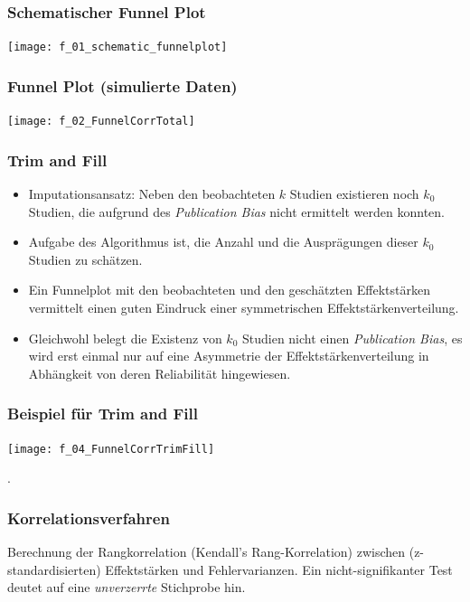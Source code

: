\begin{frame}[plain]
  \frametitle{Schematischer Funnel Plot}
  \begin{center}
    \texttt{[image: f\_01\_schematic\_funnelplot]}
  \end{center}
  \citep[Quelle: ][666]{weis_identification_2011}
\end{frame}



\begin{frame}[plain]
  \frametitle{Funnel Plot (simulierte Daten)}\label{slide:funnel-sim-data}
  \begin{center}
    \texttt{[image: f\_02\_FunnelCorrTotal]}
  \end{center}
  \citep[Quelle: n.s: $p>0.10$][666]{weis_identification_2011}
\end{frame}



 \begin{frame}
   \frametitle{Trim and Fill}
   \begin{itemize}
   \item Imputationsansatz: Neben den beobachteten $k$ Studien existieren noch
     $k_0$ Studien, die aufgrund des \emph{Publication Bias} nicht ermittelt werden
     konnten.
   \item Aufgabe des Algorithmus ist, die Anzahl und die Ausprägungen dieser
     $k_0$ Studien zu schätzen.
   \item Ein Funnelplot mit den beobachteten und den geschätzten Effektstärken
     vermittelt einen guten Eindruck einer symmetrischen
     Effektstärkenverteilung.
   \item Gleichwohl belegt die Existenz von $k_0$ Studien nicht einen
     \emph{Publication Bias}, es wird erst einmal nur auf eine Asymmetrie der
     Effektstärkenverteilung in Abhängkeit von deren Reliabilität hingewiesen.
   \end{itemize}
 \end{frame}



 \begin{frame}
   \frametitle{Beispiel für Trim and Fill}
   \begin{center}
     \texttt{[image: f\_04\_FunnelCorrTrimFill]}
   \end{center}
   \citep[Quelle: ][671]{weis_identification_2011}.
 \end{frame}



 \begin{frame}
   \frametitle{Korrelationsverfahren}
   Berechnung der Rangkorrelation (Kendall's Rang-Korrelation) zwischen
   (z-standardisierten) Effektstärken und Fehlervarianzen. Ein
   nicht-signifikanter Test deutet auf eine \emph{unverzerrte} Stichprobe hin.
 \end{frame}


